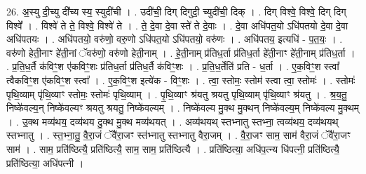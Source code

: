 \documentclass[17pt]{extarticle}
\begin{document}
26. अ॒स्यु दी॒च्यु दी᳚च्य स्य॒ स्युदी॑ची । . उदी॑ची॒ दिग् दिगुदी॒ च्युदी॑ची॒ दिक् । . दिग् विश्वे॒ विश्वे॒ दिग् दिग् विश्वे᳚ । . विश्वे॑ ते ते॒ विश्वे॒ विश्वे॑ ते । . ते॒ दे॒वा दे॒वा स्ते॑ ते दे॒वाः । . दे॒वा अधि॑पत॒यो ऽधि॑पतयो दे॒वा दे॒वा अधि॑पतयः । . अधि॑पतयो॒ वरु॑णो॒ वरु॒णो ऽधि॑पत॒यो ऽधि॑पतयो॒ वरु॑णः । . अधि॑पतय॒ इत्यधि॑ - प॒त॒यः॒ । . वरु॑णो हेती॒नाꣳ हे॑ती॒नां ॅवरु॑णो॒ वरु॑णो हेती॒नाम् । . हे॒ती॒नाम् प्र॑तिध॒र्ता प्र॑तिध॒र्ता हे॑ती॒नाꣳ हे॑ती॒नाम् प्र॑तिध॒र्ता । . प्र॒ति॒ध॒र्तै क॑विꣳ॒॒श ए॑कविꣳ॒॒शः प्र॑तिध॒र्ता प्र॑तिध॒र्तै क॑विꣳ॒॒शः । . प्र॒ति॒ध॒र्तेति॑ प्रति - ध॒र्ता । . ए॒क॒विꣳ॒॒श स्त्वा᳚ त्वैकविꣳ॒॒श ए॑कविꣳ॒॒श स्त्वा᳚ । . ए॒क॒विꣳ॒॒श इत्ये॑क - विꣳ॒॒शः । . त्वा॒ स्तोमः॒ स्तोम॑ स्त्वा त्वा॒ स्तोमः॑ । . स्तोमः॑ पृथि॒व्याम् पृ॑थि॒व्याꣳ स्तोमः॒ स्तोमः॑ पृथि॒व्याम् । . पृ॒थि॒व्याꣳ श्र॑यतु श्रयतु पृथि॒व्याम् पृ॑थि॒व्याꣳ श्र॑यतु । . श्र॒य॒तु॒ निष्के॑वल्य॒न् निष्के॑वल्यꣳ श्रयतु श्रयतु॒ निष्के॑वल्यम् । . निष्के॑वल्य मु॒क्थ मु॒क्थन् निष्के॑वल्य॒म् निष्के॑वल्य मु॒क्थम् । . उ॒क्थ मव्य॑थय॒ दव्य॑थय दु॒क्थ मु॒क्थ मव्य॑थयत् । . अव्य॑थयथ् स्तभ्नातु स्तभ्ना॒ त्वव्य॑थय॒ दव्य॑थयथ् स्तभ्नातु । . स्त॒भ्ना॒तु॒ वै॒रा॒जं ॅवै॑रा॒जꣳ स्त॑भ्नातु स्तभ्नातु वैरा॒जम् । . वै॒रा॒जꣳ साम॒ साम॑ वैरा॒जं ॅवै॑रा॒जꣳ साम॑ । . साम॒ प्रति॑ष्ठित्यै॒ प्रति॑ष्ठित्यै॒ साम॒ साम॒ प्रति॑ष्ठित्यै । . प्रति॑ष्ठित्या॒ अधि॑प॒त्न्य धि॑पत्नी॒ प्रति॑ष्ठित्यै॒ प्रति॑ष्ठित्या॒ अधि॑पत्नी । \newline
\end{document}
